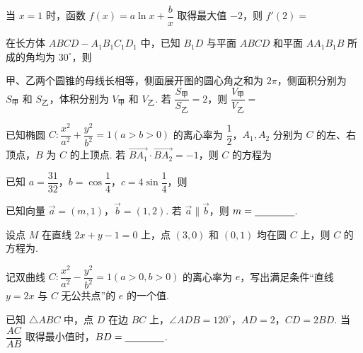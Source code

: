 \documentclass[a4paper,11pt]{report}
\begin{document}
\begin{examquestions}
\item 当 $x=1$ 时，函数 $f(x)=a\ln x+\dfrac bx$ 取得最大值 $-2$，则 $f'(2)=$
\item 在长方体 $ABCD-A_1B_1C_1D_1$ 中，已知 $B_1D$ 与平面 $ABCD$ 和平面 $AA_1B_1B$ 所成的角均为 $30^\circ$，则
\item 甲、乙两个圆锥的母线长相等，侧面展开图的圆心角之和为 $2\pi$，侧面积分别为 $S_\text{甲}$ 和 $S_\text{乙}$，体积分别为 $V_\text{甲}$ 和 $V_\text{乙}$. 若 $\dfrac{S_\text{甲}}{S_\text{乙}}=2$，则 $\dfrac{V_\text{甲}}{V_\text{乙}}=$
\vspace{-0.4em}
\item 已知椭圆 $C:\dfrac{x^2}{a^2}+\dfrac{y^2}{b^2}=1(a>b>0)$ 的离心率为 $\dfrac12$，$A_1,A_2$ 分别为 $C$ 的左、右顶点，$B$ 为 $C$ 的上顶点. 若 $\overrightarrow{BA_1}\cdot\overrightarrow{BA_2}=-1$，则 $C$ 的方程为
\item 已知 $a=\dfrac{31}{32}$，$b=\cos\dfrac14$，$c=4\sin\dfrac14$，则
\end{examquestions}
\begin{examquestions}[start=13]
\item 已知向量 $\vec a=(m,1)$，$\vec b=(1,2)$. 若 $\vec a\parallel\vec b$，则 $m=\underline{\hspace{1.4cm}}$. 
\item 设点 $M$ 在直线 $2x+y-1=0$ 上，点 $(3,0)$ 和 $(0,1)$ 均在圆 $C$ 上，则 $C$ 的方程为\blank. 
\item 记双曲线 $C:\dfrac{x^2}{a^2}-\dfrac{y^2}{b^2}=1(a>0,b>0)$ 的离心率为 $e$，写出满足条件“直线 $y=2x$ 与 $C$ 无公共点”的 $e$ 的一个值\blank. 
\item 已知 $\triangle ABC$ 中，点 $D$ 在边 $BC$ 上，$\angle ADB=120^\circ$，$AD=2$，$CD=2BD$. 当 $\dfrac{AC}{AB}$ 取得最小值时，$BD=\underline{\hspace{1.4cm}}$. 
\end{examquestions}
\end{document}
